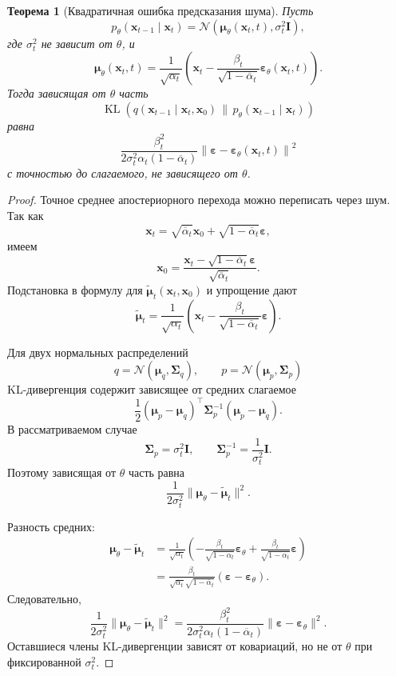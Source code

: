\documentclass[12pt,a4paper]{article}
\newtheorem{theorem}{Теорема}[section]
\theoremstyle{definition}
\newcommand{\N}{\mathcal{N}}
\newcommand{\KL}{\operatorname{KL}}
\newcommand{\eps}{\varepsilon}
\newcommand{\1}{\mathbf{1}}
\begin{document}
\begin{theorem}[Квадратичная ошибка предсказания шума]
Пусть
\[
    p_\theta(\bm{x}_{t-1}\mid\bm{x}_t)
    =
    \N(
        \bm{\mu}_\theta(\bm{x}_t,t),
        \sigma_t^2\bm{I}
    ),
\]
где $\sigma_t^2$ не зависит от $\theta$, и
\[
    \bm{\mu}_\theta(\bm{x}_t,t)
    =
    \frac{1}{\sqrt{\alpha_t}}
    \left(
        \bm{x}_t
        -
        \frac{\beta_t}
             {\sqrt{1-\overline{\alpha}_t}}
        \bm{\eps}_\theta(\bm{x}_t,t)
    \right).
\]
Тогда зависящая от $\theta$ часть
\[
    \KL\left(
        q(\bm{x}_{t-1}\mid\bm{x}_t,\bm{x}_0)
        \,\|\,
        p_\theta(\bm{x}_{t-1}\mid\bm{x}_t)
    \right)
\]
равна
\[
    \frac{
        \beta_t^2
    }{
        2\sigma_t^2\alpha_t
        (1-\overline{\alpha}_t)
    }
    \left\|
        \bm{\eps}
        -
        \bm{\eps}_\theta(\bm{x}_t,t)
    \right\|^2
\]
с точностью до слагаемого, не зависящего от $\theta$.
\end{theorem}

\begin{proof}
Точное среднее апостериорного перехода можно переписать через шум.
Так как
\[
    \bm{x}_t
    =
    \sqrt{\overline{\alpha}_t}\bm{x}_0
    +
    \sqrt{1-\overline{\alpha}_t}\bm{\eps},
\]
имеем
\[
    \bm{x}_0
    =
    \frac{
        \bm{x}_t
        -
        \sqrt{1-\overline{\alpha}_t}\bm{\eps}
    }{
        \sqrt{\overline{\alpha}_t}
    }.
\]
Подстановка в формулу для
$\widetilde{\bm{\mu}}_t(\bm{x}_t,\bm{x}_0)$ и упрощение дают
\[
    \widetilde{\bm{\mu}}_t
    =
    \frac{1}{\sqrt{\alpha_t}}
    \left(
        \bm{x}_t
        -
        \frac{\beta_t}
             {\sqrt{1-\overline{\alpha}_t}}
        \bm{\eps}
    \right).
\]

Для двух нормальных распределений
\[
    q=\N(\bm{\mu}_q,\bm{\Sigma}_q),
    \qquad
    p=\N(\bm{\mu}_p,\bm{\Sigma}_p)
\]
KL-дивергенция содержит зависящее от средних слагаемое
\[
    \frac{1}{2}
    (\bm{\mu}_p-\bm{\mu}_q)^\top
    \bm{\Sigma}_p^{-1}
    (\bm{\mu}_p-\bm{\mu}_q).
\]
В рассматриваемом случае
\[
    \bm{\Sigma}_p=\sigma_t^2\bm{I},
    \qquad
    \bm{\Sigma}_p^{-1}
    =
    \frac{1}{\sigma_t^2}\bm{I}.
\]
Поэтому зависящая от $\theta$ часть равна
\[
    \frac{1}{2\sigma_t^2}
    \|\bm{\mu}_\theta-\widetilde{\bm{\mu}}_t\|^2.
\]

Разность средних:
\begin{align*}
    \bm{\mu}_\theta-\widetilde{\bm{\mu}}_t
    &=
    \frac{1}{\sqrt{\alpha_t}}
    \left(
        -
        \frac{\beta_t}
             {\sqrt{1-\overline{\alpha}_t}}
        \bm{\eps}_\theta
        +
        \frac{\beta_t}
             {\sqrt{1-\overline{\alpha}_t}}
        \bm{\eps}
    \right)\\
    &=
    \frac{\beta_t}
         {\sqrt{\alpha_t}
          \sqrt{1-\overline{\alpha}_t}}
    (\bm{\eps}-\bm{\eps}_\theta).
\end{align*}
Следовательно,
\[
    \frac{1}{2\sigma_t^2}
    \|\bm{\mu}_\theta-\widetilde{\bm{\mu}}_t\|^2
    =
    \frac{
        \beta_t^2
    }{
        2\sigma_t^2\alpha_t
        (1-\overline{\alpha}_t)
    }
    \|\bm{\eps}-\bm{\eps}_\theta\|^2.
\]
Оставшиеся члены KL-дивергенции зависят от ковариаций, но не от
$\theta$ при фиксированной $\sigma_t^2$.
\end{proof}
\end{document}
